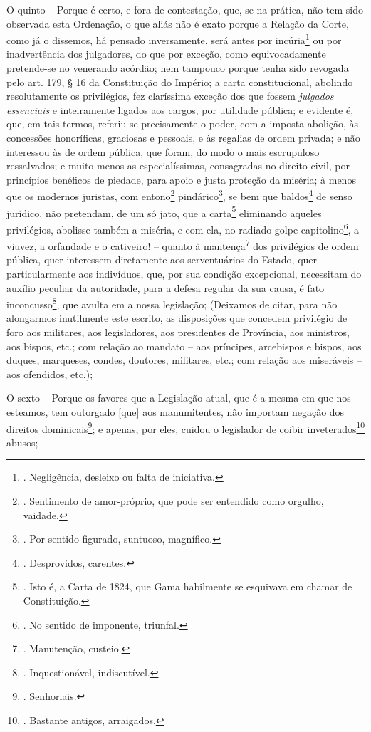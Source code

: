 O quinto -- Porque é certo, e fora de contestação, que, se na prática,
não tem sido observada esta Ordenação, o que aliás não é exato porque a
Relação da Corte, como já o dissemos, há pensado inversamente, será
antes por incúria\footnote{. Negligência, desleixo ou falta de
  iniciativa.} ou por inadvertência dos julgadores, do que por exceção,
como equivocadamente pretende-se no venerando acórdão; nem tampouco
porque tenha sido revogada pelo art. 179, § 16 da Constituição do
Império; a carta constitucional, abolindo resolutamente os privilégios,
fez claríssima exceção dos que fossem \emph{julgados essenciais} e
inteiramente ligados aos cargos, por utilidade pública; e evidente é,
que, em tais termos, referiu-se precisamente o poder, com a imposta
abolição, às concessões honoríficas, graciosas e pessoais, e às regalias
de ordem privada; e não interessou às de ordem pública, que foram, do
modo o mais escrupuloso ressalvados; e muito menos as especialíssimas,
consagradas no direito civil, por princípios benéficos de piedade, para
apoio e justa proteção da miséria; à menos que os modernos juristas, com
entono\footnote{. Sentimento de amor-próprio, que pode ser entendido
  como orgulho, vaidade.} pindárico\footnote{. Por sentido figurado,
  suntuoso, magnífico.}, se bem que baldos\footnote{. Desprovidos,
  carentes.} de senso jurídico, não pretendam, de um só jato, que a
carta\footnote{. Isto é, a Carta de 1824, que Gama habilmente se
  esquivava em chamar de Constituição.} eliminando aqueles privilégios,
abolisse também a miséria, e com ela, no radiado golpe
capitolino\footnote{. No sentido de imponente, triunfal.}, a viuvez, a
orfandade e o cativeiro! -- quanto à mantença\footnote{. Manutenção,
  custeio.} dos privilégios de ordem pública, quer interessem
diretamente aos serventuários do Estado, quer particularmente aos
indivíduos, que, por sua condição excepcional, necessitam do auxílio
peculiar da autoridade, para a defesa regular da sua causa, é fato
inconcusso\footnote{. Inquestionável, indiscutível.}, que avulta em a
nossa legislação; (Deixamos de citar, para não alongarmos inutilmente
este escrito, as disposições que concedem privilégio de foro aos
militares, aos legisladores, aos presidentes de Província, aos
ministros, aos bispos, etc.; com relação ao mandato -- aos príncipes,
arcebispos e bispos, aos duques, marqueses, condes, doutores, militares,
etc.; com relação aos miseráveis -- aos ofendidos, etc.);

O sexto -- Porque os favores que a Legislação atual, que é a mesma em
que nos esteamos, tem outorgado {[}que{]} aos manumitentes, não importam
negação dos direitos dominicais\footnote{. Senhoriais.}; e apenas, por
eles, cuidou o legislador de coibir inveterados\footnote{. Bastante
  antigos, arraigados.} abusos;

